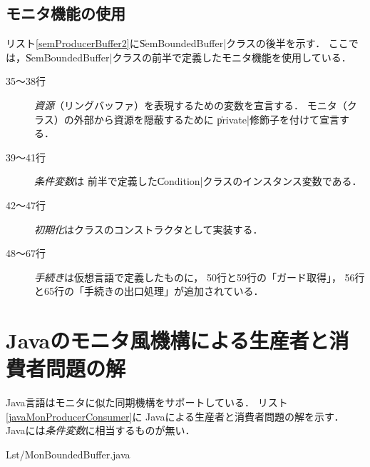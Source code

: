 \subsection{モニタ機能の使用}
リスト\ref{semProducerBuffer2}に\|SemBoundedBuffer|クラスの後半を示す．
ここでは，\|SemBoundedBuffer|クラスの前半で定義したモニタ機能を使用している．

\begin{description}
\item [35〜38行]
  \emph{資源}（リングバッファ）を表現するための変数を宣言する．
  モニタ（クラス）の外部から資源を隠蔽するために
  \|private|修飾子を付けて宣言する．
\item [39〜41行]
  \emph{条件変数}は
  前半で定義した\|Condition|クラスのインスタンス変数である．
\item [42〜47行]
  \emph{初期化}はクラスのコンストラクタとして実装する．
\item [48〜67行]
  \emph{手続き}は仮想言語で定義したものに，
  50行と59行の「ガード取得」，
  56行と65行の「手続きの出口処理」が追加されている．
\end{description}

\section{Javaのモニタ風機構による生産者と消費者問題の解}
Java言語はモニタに似た同期機構をサポートしている．
リスト\ref{javaMonProducerConsumer}に
Javaによる生産者と消費者問題の解を示す．
Javaには\emph{条件変数}に相当するものが無い．


                {Lst/MonBoundedBuffer.java}

